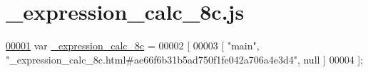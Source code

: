 \hypertarget{__expression__calc__8c_8js_source}{\section{\+\_\+expression\+\_\+calc\+\_\+8c.\+js}
\label{__expression__calc__8c_8js_source}
}

\begin{DoxyCode}
\hypertarget{__expression__calc__8c_8js_source_l00001}{}\hyperlink{__expression__calc__8c_8js_a36f1aefc384223d9d62a0ad0ed477063}{00001} var \hyperlink{__expression__calc__8c_8js_a36f1aefc384223d9d62a0ad0ed477063}{\_expression\_calc\_8c} =
00002 [
00003     [ \textcolor{stringliteral}{"main"}, \textcolor{stringliteral}{"\_expression\_calc\_8c.html#ae66f6b31b5ad750f1fe042a706a4e3d4"}, null ]
00004 ];
\end{DoxyCode}

